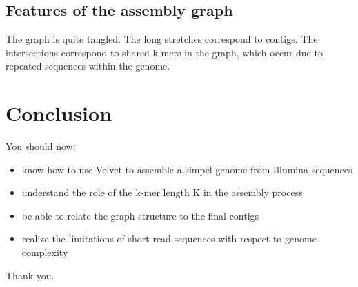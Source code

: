 \subsection{Features of the assembly graph}
The graph is quite tangled. The long stretches correspond to contigs. The intersections correspond to shared k-mers in the graph, which occur due to repeated sequences within the genome.


\section{Conclusion}
You should now:
\begin{itemize}
\item know how to use Velvet to assemble a simpel genome from Illumina sequences
\item understand the role of the k-mer length K in the assembly process
\item be able to relate the graph structure to the final contigs
\item realize the limitations of short read sequences with respect to genome complexity
\end{itemize}
Thank you.
